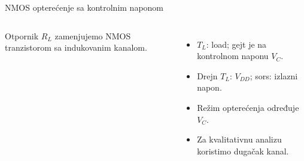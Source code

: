 \begin{frame}[label=09_1-s036]{NMOS opterećenje sa kontrolnim naponom}\setlength{\parskip}{2pt}\setlength{\abovedisplayskip}{4pt}\setlength{\belowdisplayskip}{4pt}\setlength{\abovedisplayshortskip}{3pt}\setlength{\belowdisplayshortskip}{3pt}
\begin{columns}[T,onlytextwidth]\centering {}Otpornik $R_L$ zamenjujemo NMOS tranzistorom sa indukovanim kanalom.
\begin{itemize}
\item $T_L$: load; gejt je na kontrolnom naponu $V_C$.
\item Drejn $T_L$: $V_{DD}$; sors: izlazni napon.
\item Režim opterećenja određuje $V_C$.
\item Za kvalitativnu analizu koristimo \alert{dugačak kanal}.
\end{itemize}\end{columns}
\end{frame}
